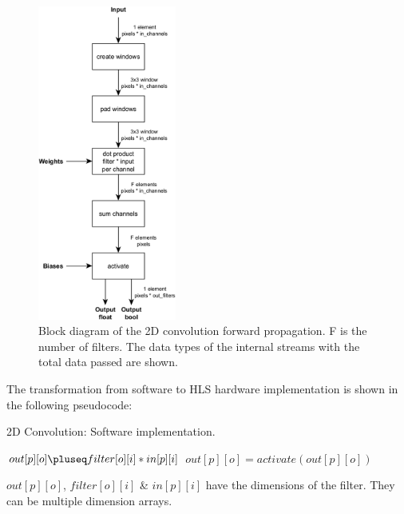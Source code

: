 \begin{figure}[H]
    \centering
        \includegraphics[width=0.406\textwidth]{Images/block_diagrams/conv2d_fp_mc.png}
        \decoRule
        \caption[Conv2D forward propagation block diagram]{Block diagram of the 2D convolution forward propagation. F is the number of filters. The data types of the internal streams with the total data passed are shown. }
        \label{fig: Conv2D forward propagation block diagram}
\end{figure}

The transformation from software to HLS hardware implementation is shown in the following pseudocode:
\begin{algorithm}[H]
    \caption[Conv2d Software implementation.]{2D Convolution: Software implementation.}
    \label{alg:Conv2d_SW}
    \begin{algorithmic}
                        \State $out[p][o] \pluseq filter[o][i] * in[p][i]$
                    \EndFor
                    \State $out[p][o] = activate(out[p][o])$
                \EndFor
            \EndFor
        \EndFunction
    \end{algorithmic}
    $out[p][o]$, $filter[o][i]$ \& $in[p][i]$ have the dimensions of the filter. They can be multiple dimension arrays.
\end{algorithm}


